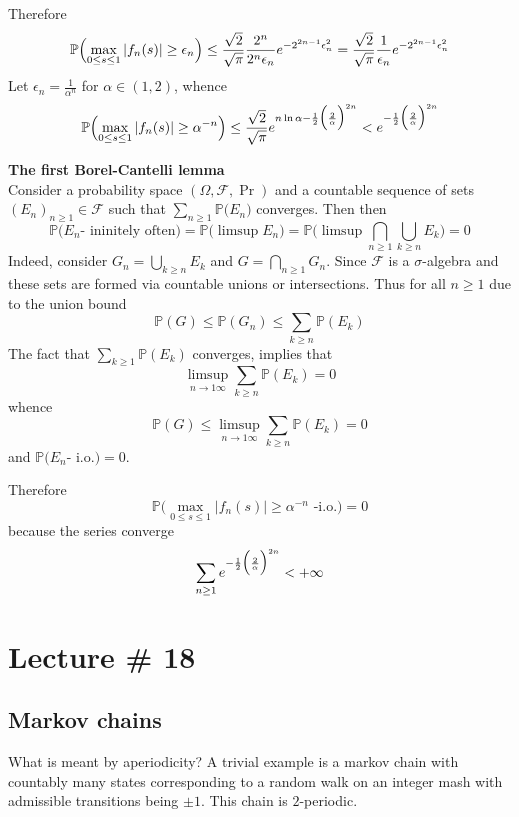 \documentclass[a4paper]{article}
\newcommand{\Fcal}{\mathcal{F}}
\newcommand{\pr}{\mathbb{P}}
\begin{document}
Therefore
\[
\pr\Bigl( \max_{0\leq s\leq 1} |f_n(s)| \geq \epsilon_n \Bigr)
\leq \frac{\sqrt{2}}{\sqrt{\pi}} \frac{2^n}{2^n \epsilon_n} e^{-2^{2n-1} \epsilon_n^2}
= \frac{\sqrt{2}}{\sqrt{\pi}} \frac{1}{\epsilon_n} e^{-2^{2n-1} \epsilon_n^2}
\]
Let $\epsilon_n = \frac{1}{\alpha^n}$ for $\alpha\in(1,2)$, whence
\[
\pr\Bigl( \max_{0\leq s\leq 1} |f_n(s)| \geq \alpha^{-n} \Bigr)
\leq \frac{\sqrt{2}}{\sqrt{\pi}} e^{n\ln \alpha - \frac{1}{2} \Bigl( \frac{2}{\alpha}\Bigr)^{2n}}
< e^{- \frac{1}{2} \Bigl( \frac{2}{\alpha}\Bigr)^{2n}}
\]

\noindent\textbf{The first Borel-Cantelli lemma}\hfill\\
Consider a probability space $(\Omega, \Fcal, \Pr)$ and a countable sequence of sets
$(E_n)_{n\geq1}\in \Fcal$ such that $\sum_{n\geq1} \pr\bigl(E_n\bigr)$ converges. Then
then
\[
\pr\bigl( E_n \text{- ininitely often} \bigr)
= \pr\bigl( \limsup E_n \bigr)
= \pr\bigl( \limsup \bigcap_{n\geq1} \bigcup_{k\geq n} E_k \bigr)
= 0
\]
Indeed, consider $G_n = \bigcup_{k\geq n} E_k$ and $G = \bigcap_{n\geq1} G_n$. Since
$\Fcal$ is a $\sigma$-algebra and these sets are formed via countable unions or
intersections. Thus for all $n\geq1$ due to the union bound
\[
\pr(G)
\leq \pr(G_n)
\leq \sum_{k\geq n} \pr(E_k)
\]
The fact that $\sum_{k\geq1} \pr(E_k)$ converges, implies that
\[
\limsup_{n\to 1\infty}\sum_{k\geq n} \pr(E_k) = 0
\]
whence
\[
\pr(G)
\leq \limsup_{n\to 1\infty} \sum_{k\geq n} \pr(E_k)
= 0
\]
and $\pr\bigl( E_n \text{- i.o.} \bigr) = 0$.

Therefore
\[ \pr\bigl( \max_{0\leq s\leq 1} |f_n(s)| \geq \alpha^{-n} \text{ -i.o.} \bigr) = 0 \]
because the series converge
\[ \sum_{n\geq 1} e^{- \frac{1}{2} \Bigl( \frac{2}{\alpha} \Bigr)^{2n}} < +\infty \]






\section{Lecture \# 18} %
\label{sec:lecture_18}

\subsection{Markov chains} %
\label{sub:markov_chains}

What is meant by aperiodicity? A trivial example is a markov chain with countably
many states corresponding to a random walk on an integer mash with admissible
transitions being $\pm1$. This chain is $2$-periodic.
\end{document}
